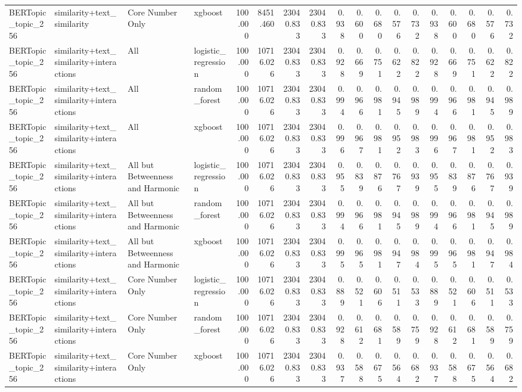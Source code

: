 \begin{tabular}{llllrrrrrrrrrrrrrr}
BERTopic\_topic\_256 & similarity+text\_similarity & Core Number Only & xgboost & 100.000 & 8451.460 & 23040.833 & 23040.833 & 0.938 & 0.600 & 0.680 & 0.576 & 0.732 & 0.938 & 0.600 & 0.680 & 0.576 & 0.732 \\
BERTopic\_topic\_256 & similarity+text\_similarity+interactions & All & logistic\_regression & 100.000 & 10716.026 & 23040.833 & 23040.833 & 0.928 & 0.669 & 0.751 & 0.622 & 0.822 & 0.928 & 0.669 & 0.751 & 0.622 & 0.822 \\
BERTopic\_topic\_256 & similarity+text\_similarity+interactions & All & random\_forest & 100.000 & 10716.026 & 23040.833 & 23040.833 & 0.994 & 0.966 & 0.981 & 0.945 & 0.989 & 0.994 & 0.966 & 0.981 & 0.945 & 0.989 \\
BERTopic\_topic\_256 & similarity+text\_similarity+interactions & All & xgboost & 100.000 & 10716.026 & 23040.833 & 23040.833 & 0.996 & 0.967 & 0.981 & 0.952 & 0.983 & 0.996 & 0.967 & 0.981 & 0.952 & 0.983 \\
BERTopic\_topic\_256 & similarity+text\_similarity+interactions & All but Betweenness and Harmonic & logistic\_regression & 100.000 & 10716.026 & 23040.833 & 23040.833 & 0.955 & 0.839 & 0.876 & 0.767 & 0.939 & 0.955 & 0.839 & 0.876 & 0.767 & 0.939 \\
BERTopic\_topic\_256 & similarity+text\_similarity+interactions & All but Betweenness and Harmonic & random\_forest & 100.000 & 10716.026 & 23040.833 & 23040.833 & 0.994 & 0.966 & 0.981 & 0.945 & 0.989 & 0.994 & 0.966 & 0.981 & 0.945 & 0.989 \\
BERTopic\_topic\_256 & similarity+text\_similarity+interactions & All but Betweenness and Harmonic & xgboost & 100.000 & 10716.026 & 23040.833 & 23040.833 & 0.995 & 0.965 & 0.981 & 0.947 & 0.984 & 0.995 & 0.965 & 0.981 & 0.947 & 0.984 \\
BERTopic\_topic\_256 & similarity+text\_similarity+interactions & Core Number Only & logistic\_regression & 100.000 & 10716.026 & 23040.833 & 23040.833 & 0.889 & 0.521 & 0.606 & 0.511 & 0.533 & 0.889 & 0.521 & 0.606 & 0.511 & 0.533 \\
BERTopic\_topic\_256 & similarity+text\_similarity+interactions & Core Number Only & random\_forest & 100.000 & 10716.026 & 23040.833 & 23040.833 & 0.928 & 0.612 & 0.681 & 0.589 & 0.759 & 0.928 & 0.612 & 0.681 & 0.589 & 0.759 \\
BERTopic\_topic\_256 & similarity+text\_similarity+interactions & Core Number Only & xgboost & 100.000 & 10716.026 & 23040.833 & 23040.833 & 0.937 & 0.588 & 0.675 & 0.564 & 0.682 & 0.937 & 0.588 & 0.675 & 0.564 & 0.682 \\

\end{tabular}
